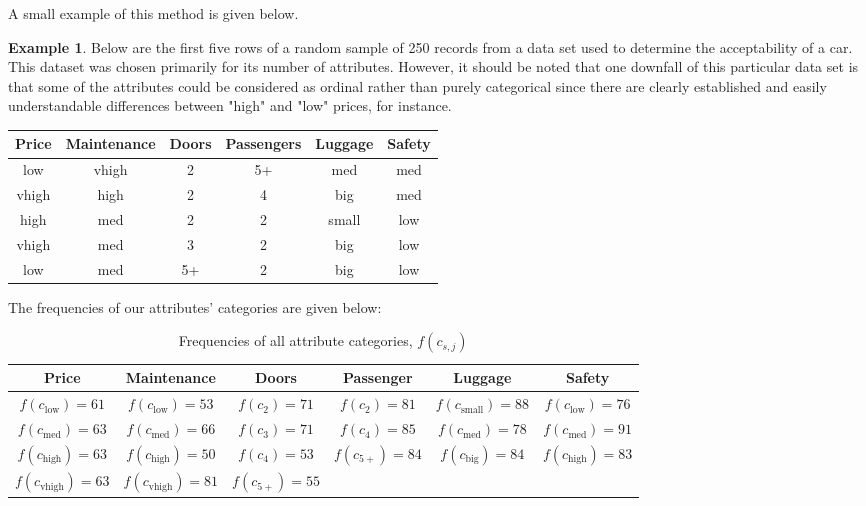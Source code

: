 \documentclass{article}
\theoremstyle{definition}
\newtheorem{example}{Example}
\begin{document}
A small example of this method is given below. \\


\begin{example}	
	Below are the first five rows of a random sample of 250 records from a data set used to determine the acceptability of a car. This dataset was chosen primarily for its number of attributes. However, it should be noted that one downfall of this particular data set is that some of the attributes could be considered as ordinal rather than purely categorical since there are clearly established and easily understandable differences between "high" and "low" prices, for instance. \\
	
	\begin{table}[H]
		\centering
			\begin{tabular}{c|c|c|c|c|c}\label{table:1}
			Price & Maintenance & Doors & Passengers & Luggage & Safety \\
			\hline
			low &               vhigh &            2 &                  5+ &              med &          med \\
        	vhigh &             high &            2 &                  4 &              big &          med \\
        	high &             med &            2 &                  2 &              small &          low \\          
        	vhigh &              med &            3 &                  2 &            big &          low \\         
        	low &             med &            5+ &                  2 &              big &           low \\
			\end{tabular}
	\end{table}
	
	The frequencies of our attributes' categories are given below: \\
	
	\begin{table}[H]
		\centering
		\begin{tabular}{c|c|c|c|c|c}\label{table:2}
    		Price	&	Maintenance	&	Doors	&	Passenger	&	Luggage &	Safety	\\
    		\hline
    		$ f(c_{\text{low}}) = 61 $		&	$ f(c_{\text{low}}) = 53 $		&	$ f(c_{2}) = 71 $	   	&	$ f(c_{2}) = 81 $		&	$ f(c_{\text{small}}) = 88 $		&	$ f(c_{\text{low}}) = 76 $	\\
    		$ f(c_{\text{med}}) = 63 $		&	$ f(c_{\text{med}}) = 66 $		&	$ f(c_{3}) = 71 $		& 	$ f(c_{4}) = 85 $		&	$ f(c_{\text{med}}) = 78 $	&	$ f(c_{\text{med}}) = 91 $	\\
    		$ f(c_{\text{high}}) = 63 $		 &	 $ f(c_{\text{high}}) = 50 $		  &	  $ f(c_{4}) = 53 $	   &	$ f(c_{5+}) = 84 $	&	$ f(c_{\text{big}}) = 84 $	  &		$ f(c_{\text{high}}) = 83 $	\\
    		$ f(c_{\text{vhigh}}) = 63 $	&	$ f(c_{\text{vhigh}}) = 81 $	&	$ f(c_{5+}) = 55 $		&				{}					&					{}						&						{}					\\
		\end{tabular}
		\caption{Frequencies of all attribute categories, $f(c_{s,j})$}
	\end{table}


\end{example}
\end{document}
